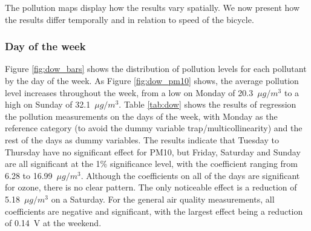 \documentclass[11pt,twosided,a4paper]{report}
\begin{document}
The pollution maps display how the results vary spatially. We now present how the results differ temporally and in relation to speed of the bicycle.

\subsubsection{Day of the week}

Figure \ref{fig:dow_bars} shows the distribution of pollution levels for each pollutant by the day of the week. As Figure \ref{fig:dow_pm10} shows, the average pollution level increases throughout the week, from a low on Monday of 20.3~$\mu g/m^3$ to a high on Sunday of 32.1~$\mu g/m^3$. Table \ref{tab:dow} shows the results of regression the pollution measurements on the days of the week, with Monday as the reference category (to avoid the dummy variable trap/multicollinearity) and the rest of the days as dummy variables. The results indicate that Tuesday to Thursday have no significant effect for PM10, but Friday, Saturday and Sunday are all significant at the 1\% significance level, with the coefficient ranging from 6.28 to 16.99~$\mu g/m^3$. Although the coefficients on all of the days are significant for ozone, there is no clear pattern. The only noticeable effect is a reduction of 5.18~$\mu g/m^3$ on a Saturday. For the general air quality measurements, all coefficients are negative and significant, with the largest effect being a reduction of 0.14~V at the weekend.
\end{document}
